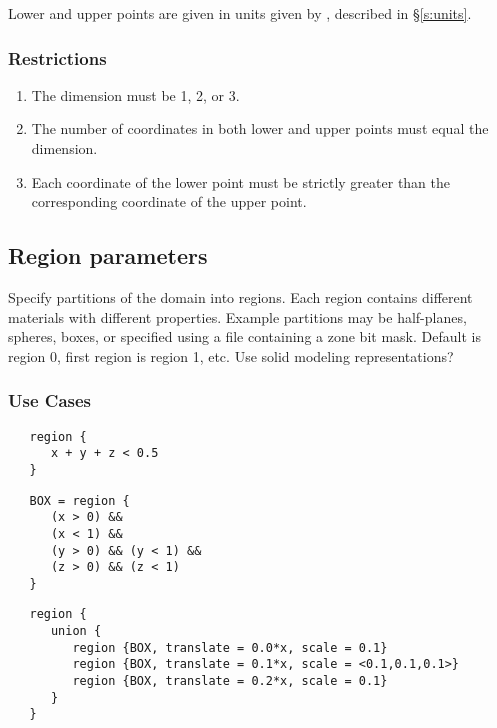 Lower and upper points are given in units given by ,
described in \S\ref{s:units}.

\subsubsection{Restrictions}

\begin{enumerate}
\item The dimension must be 1, 2, or 3.
\item The number of coordinates in both lower and upper points must equal the dimension.
\item Each coordinate of the lower point must be strictly greater than the corresponding coordinate of the upper point.
\end{enumerate}

\subsection{Region parameters} \label{s:region}


Specify partitions of the domain into regions.  Each region contains
different materials with different properties.  Example partitions may
be half-planes, spheres, boxes, or specified using a file containing a
zone bit mask.  Default is region 0, first region is region 1, etc.
Use solid modeling representations?

\subsubsection{Use Cases}

\begin{verbatim}
   region {
      x + y + z < 0.5
   }
\end{verbatim}

\begin{verbatim}
   BOX = region {
      (x > 0) &&
      (x < 1) &&
      (y > 0) && (y < 1) &&
      (z > 0) && (z < 1)
   }
\end{verbatim}

\begin{verbatim}
   region {
      union {
         region {BOX, translate = 0.0*x, scale = 0.1}
         region {BOX, translate = 0.1*x, scale = <0.1,0.1,0.1>}
         region {BOX, translate = 0.2*x, scale = 0.1}
      }
   }
\end{verbatim}

